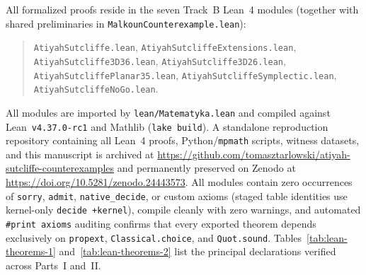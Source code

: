 \documentclass[11pt,reqno]{amsart}
\theoremstyle{remark}
\begin{document}
All formalized proofs reside in the seven Track~B Lean~4 modules (together with shared preliminaries in \texttt{MalkounCounterexample.lean}):
\begin{quote}\small\raggedright
\texttt{AtiyahSutcliffe.lean}, \texttt{AtiyahSutcliffeExtensions.lean}, \texttt{AtiyahSutcliffe3D36.lean}, \texttt{AtiyahSutcliffe3D26.lean}, \texttt{AtiyahSutcliffePlanar35.lean}, \texttt{AtiyahSutcliffeSymplectic.lean}, \texttt{AtiyahSutcliffeNoGo.lean}.
\end{quote}
All modules are imported by \texttt{lean/Matematyka.lean} and compiled against Lean~\texttt{v4.37.0-rc1} and Mathlib (\texttt{lake build}).
A standalone reproduction repository containing all Lean~4 proofs, Python/\texttt{mpmath} scripts, witness datasets, and this manuscript is archived at \url{https://github.com/tomasztarlowski/atiyah-sutcliffe-counterexamples} and permanently preserved on Zenodo at \url{https://doi.org/10.5281/zenodo.24443573}.
All modules contain zero occurrences of \texttt{sorry}, \texttt{admit}, \texttt{native\_decide}, or custom axioms (staged table identities use kernel-only \texttt{decide +kernel}), compile cleanly with zero warnings, and automated \texttt{\#print axioms} auditing confirms that every exported theorem depends exclusively on \texttt{propext}, \texttt{Classical.choice}, and \texttt{Quot.sound}.
Tables~\ref{tab:lean-theorems-1} and~\ref{tab:lean-theorems-2} list the principal declarations verified across Parts~I and~II.
\end{document}

